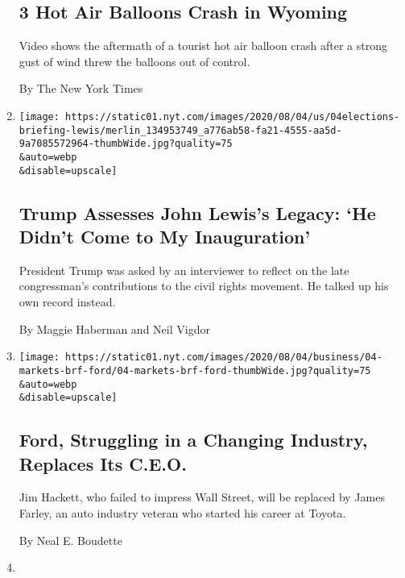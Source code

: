 \begin{enumerate}
  \hypertarget{3-hot-air-balloons-crash-in-wyoming}{%
  \subsection{3 Hot Air Balloons Crash in
  Wyoming}\label{3-hot-air-balloons-crash-in-wyoming}}

  Video shows the aftermath of a tourist hot air balloon crash after a
  strong gust of wind threw the balloons out of control.

  By The New York Times
\item
  \href{/2020/08/04/us/politics/trump-john-lewis-axios.html}{}

  \texttt{[image: https://static01.nyt.com/images/2020/08/04/us/04elections-briefing-lewis/merlin\_134953749\_a776ab58-fa21-4555-aa5d-9a7085572964-thumbWide.jpg?quality=75\\\&auto=webp\\\&disable=upscale]}

  \hypertarget{trump-assesses-john-lewiss-legacy-he-didnt-come-to-my-inauguration}{%
  \subsection{Trump Assesses John Lewis's Legacy: `He Didn't Come to My
  Inauguration'}\label{trump-assesses-john-lewiss-legacy-he-didnt-come-to-my-inauguration}}

  President Trump was asked by an interviewer to reflect on the late
  congressman's contributions to the civil rights movement. He talked up
  his own record instead.

  By Maggie Haberman and Neil Vigdor
\item
  \href{/2020/08/04/business/ford-jim-hackett-james-farley.html}{}

  \texttt{[image: https://static01.nyt.com/images/2020/08/04/business/04-markets-brf-ford/04-markets-brf-ford-thumbWide.jpg?quality=75\\\&auto=webp\\\&disable=upscale]}

  \hypertarget{ford-struggling-in-a-changing-industry-replaces-its-ceo}{%
  \subsection{Ford, Struggling in a Changing Industry, Replaces Its
  C.E.O.}\label{ford-struggling-in-a-changing-industry-replaces-its-ceo}}

  Jim Hackett, who failed to impress Wall Street, will be replaced by
  James Farley, an auto industry veteran who started his career at
  Toyota.

  By Neal E. Boudette
\item
  \href{/video/us/100000007271735/tropical-storm-isaias-carolinas.html}{}


\end{enumerate}
